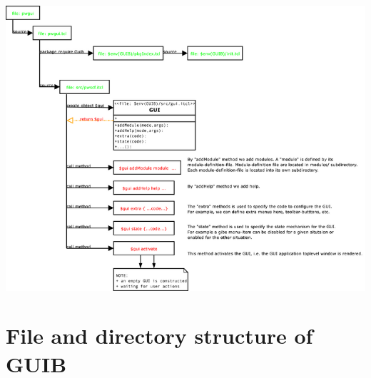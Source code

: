 \documentclass[12pt]{article}
\begin{document}
\includegraphics[width=1.0\textwidth]{diagrams/PWgui.png}

\section{File and directory structure of GUIB}
\end{document}
